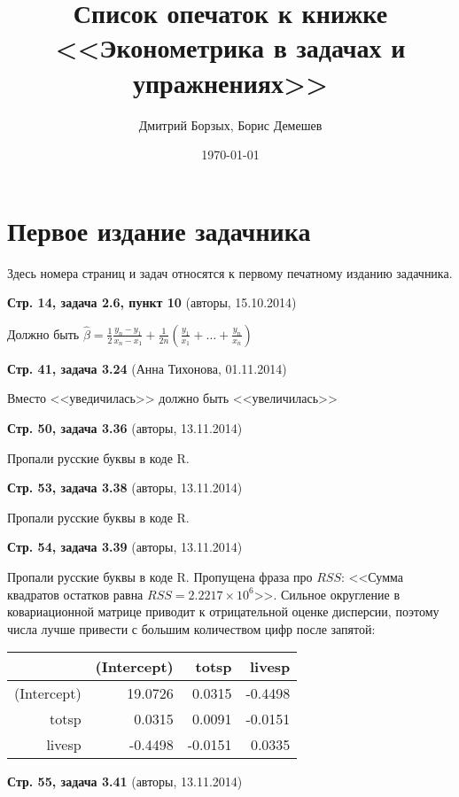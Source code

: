 \documentclass{article}
\date{\today}
\title{Список опечаток к книжке \\
<<Эконометрика в задачах и упражнениях>>}
\author{Дмитрий Борзых, Борис Демешев}
\newcommand{\erroronpage}[4]{\textbf{Стр. #1, #2} (#3, #4)}
\begin{document}
\maketitle

\section{Первое издание задачника}

Здесь номера страниц и задач относятся к первому печатному изданию задачника.




\erroronpage{14}{задача 2.6, пункт 10}{авторы}{15.10.2014}

Должно быть $\hat{\beta} = \frac{1}{2} \frac{y_n - y_1}{x_n - x_1} + \frac{1}{2n}  \left( \frac{y_1}{x_1} + \ldots + \frac{y_n}{x_n} \right) $

\erroronpage{41}{задача 3.24}{Анна Тихонова}{01.11.2014}

Вместо <<уведичилась>> должно быть <<увеличилась>>

\erroronpage{50}{задача 3.36}{авторы}{13.11.2014}

Пропали русские буквы в коде R.

\erroronpage{53}{задача 3.38}{авторы}{13.11.2014}

Пропали русские буквы в коде R.

\erroronpage{54}{задача 3.39}{авторы}{13.11.2014}

Пропали русские буквы в коде R. Пропущена фраза про $RSS$:
<<Сумма квадратов остатков равна $RSS=\ensuremath{2.2217\times 10^{6}}$>>. 
Сильное округление в ковариационной матрице приводит к отрицательной оценке дисперсии, поэтому числа лучше привести с большим количеством цифр после запятой:

\begin{table}[ht]
\centering
\begin{tabular}{rrrr}
  \hline
 & (Intercept) & totsp & livesp \\ 
  \hline
(Intercept) & 19.0726 & 0.0315 & -0.4498 \\ 
  totsp & 0.0315 & 0.0091 & -0.0151 \\ 
  livesp & -0.4498 & -0.0151 & 0.0335 \\ 
   \hline
\end{tabular}
\end{table}


\erroronpage{55}{задача 3.41}{авторы}{13.11.2014}
\end{document}
